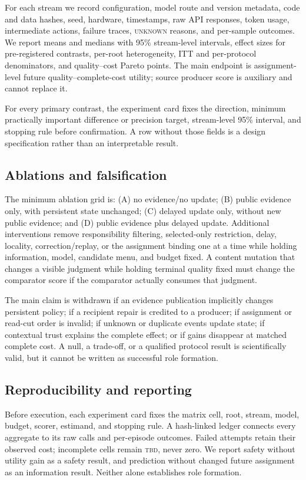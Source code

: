 \documentclass[sigconf,anonymous]{aamas}
\newcommand{\unknown}{\textsc{unknown}}
\begin{document}
For each stream we record configuration, model route and version metadata, code and data hashes, seed, hardware, timestamps, raw API responses, token usage, intermediate actions, failure traces, \unknown{} reasons, and per-sample outcomes. We report means and medians with 95\% stream-level intervals, effect sizes for pre-registered contrasts, per-root heterogeneity, ITT and per-protocol denominators, and quality--cost Pareto points. The main endpoint is assignment-level future quality--complete-cost utility; source producer score is auxiliary and cannot replace it.

For every primary contrast, the experiment card fixes the direction, minimum practically important difference or precision target, stream-level 95\% interval, and stopping rule before confirmation. A row without those fields is a design specification rather than an interpretable result.

\subsection{Ablations and falsification}
The minimum ablation grid is: (A) no evidence/no update; (B) public evidence only, with persistent state unchanged; (C) delayed update only, without new public evidence; and (D) public evidence plus delayed update. Additional interventions remove responsibility filtering, selected-only restriction, delay, locality, correction/replay, or the assignment binding one at a time while holding information, model, candidate menu, and budget fixed. A content mutation that changes a visible judgment while holding terminal quality fixed must change the comparator score if the comparator actually consumes that judgment.

The main claim is withdrawn if an evidence publication implicitly changes persistent policy; if a recipient repair is credited to a producer; if assignment or read-cut order is invalid; if unknown or duplicate events update state; if contextual trust explains the complete effect; or if gains disappear at matched complete cost. A null, a trade-off, or a qualified protocol result is scientifically valid, but it cannot be written as successful role formation.

\subsection{Reproducibility and reporting}
Before execution, each experiment card fixes the matrix cell, root, stream, model, budget, scorer, estimand, and stopping rule. A hash-linked ledger connects every aggregate to its raw calls and per-episode outcomes. Failed attempts retain their observed cost; incomplete cells remain \textsc{tbd}, never zero. We report safety without utility gain as a safety result, and prediction without changed future assignment as an information result. Neither alone establishes role formation.
\end{document}
